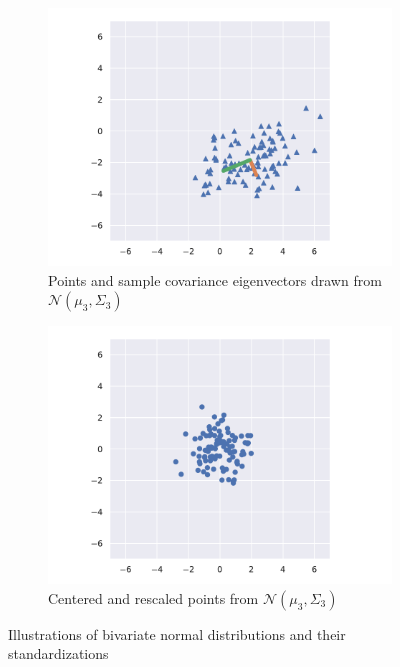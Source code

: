 \documentclass[11pt,letterpaper]{article}
\numberwithin{equation}{section}
\numberwithin{figure}{section}
\begin{document}
\begin{figure}[p]
\begin{subfigure}[t]{0.49\textwidth}
	\includegraphics[width=\textwidth]{figures/unscale_plot_3.pdf}
	\caption{Points and sample covariance eigenvectors drawn from $\mathcal{N}(\mu_3,\Sigma_3)$}
\end{subfigure}
%
\begin{subfigure}[t]{0.49\textwidth}
	\centering
	\includegraphics[width=\textwidth]{figures/scale_plot_3.pdf}
	\caption{Centered and rescaled points from $\mathcal{N}(\mu_3,\Sigma_3)$}
\end{subfigure}
\caption{Illustrations of bivariate normal distributions and their standardizations}
\label{fig:gaussians}
\end{figure}
\end{document}
